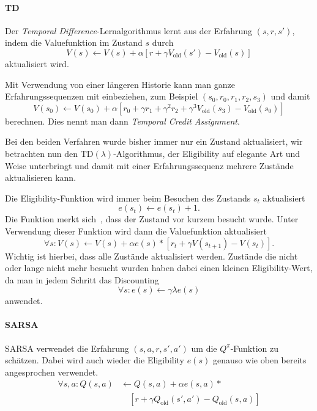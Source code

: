 \documentclass[ngerman]{../LaTeX-Templates/Paper/paper}
\newcommand{\enqo}[1]{\glqq #1\grqq\ }
\begin{document}
\paragraph{TD}
Der \emph{Temporal Difference}-Lernalgorithmus lernt aus der Erfahrung $(s,r,s')$, indem die Valuefunktion im Zustand $s$ durch
\begin{equation*}
	V(s)\leftarrow V(s)+\alpha [r+\gamma V_{\text{old}}(s')-V_{\text{old}}(s)]
\end{equation*}
aktualisiert wird.

Mit Verwendung von einer längeren Historie kann man ganze Erfahrungssequenzen mit einbeziehen, zum Beispiel $(s_0,r_0,r_1,r_2,s_3)$ und damit
\begin{equation*}
	V(s_0)\leftarrow V(s_0)+\alpha [r_0+\gamma r_1+\gamma^2r_2+\gamma^3 V_{\text{old}}(s_3)-V_{\text{old}}(s_0)]
\end{equation*}
berechnen. Dies nennt man dann \emph{Temporal Credit Assignment}.

Bei den beiden Verfahren wurde bisher immer nur ein Zustand aktualisiert, wir betrachten nun den $\mathrm{TD}(\lambda)$-Algorithmus, der Eligibility auf elegante Art und Weise unterbringt und damit mit einer Erfahrungssequenz mehrere Zustände aktualisieren kann.

Die Eligibility-Funktion wird immer beim Besuchen des Zustands $s_t$ aktualisiert
\begin{equation*}
	e(s_t)\leftarrow e(s_t)+1.
\end{equation*}
Die Funktion \enqo{merkt sich}, dass der Zustand vor kurzem besucht wurde. Unter Verwendung dieser Funktion wird dann die Valuefunktion aktualisiert
\begin{equation*}
	\forall s:V(s)\leftarrow V(s)+\alpha e(s)*[r_t+\gamma V(s_{t+1})-V(s_t)].
\end{equation*}
Wichtig ist hierbei, dass alle Zustände aktualisiert werden.
Zustände die nicht oder lange nicht mehr besucht wurden haben dabei einen kleinen Eligibility-Wert, da man in jedem Schritt das Discounting
\begin{equation*}
	\forall s:e(s)\leftarrow \gamma\lambda e(s)
\end{equation*}
anwendet.

\paragraph{SARSA}
SARSA verwendet die Erfahrung $(s,a,r,s',a')$ um die $Q^\pi$-Funktion zu schätzen. Dabei wird auch wieder die Eligibility $e(s)$ genauso wie oben bereits angesprochen verwendet.
\begin{align*}
	\forall s,a:Q(s,a)&\leftarrow Q(s,a)+\alpha e(s,a)*\\
	&\quad[r+\gamma Q_{\text{old}}(s',a')-Q_{\text{old}}(s,a)]
\end{align*}
\end{document}
